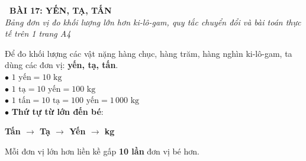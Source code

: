 \documentclass[14pt,a4paper,oneside]{extbook}
\begin{document}
\noindent
\begin{tcolorbox}[
  enhanced,
  colback=teal!8!white,
  colframe=teal!80!black,
  arc=3mm, boxrule=1pt,
  left=3mm, right=3mm, top=2mm, bottom=2mm,
  halign=center
]
  {\Large\bfseries\color{teal!90!black}\faBookmark\ BÀI 17: YẾN, TẠ, TẤN}\\[1.5pt]
  {\footnotesize\itshape\color{black!75} Bảng đơn vị đo khối lượng lớn hơn ki-lô-gam, quy tắc chuyển đổi và bài toán thực tế trên 1 trang A4}
\end{tcolorbox}

\vspace{2mm}

\noindent
\begin{minipage}[t]{0.49\textwidth}
  \begin{tcolorbox}[
    enhanced,
    title={\footnotesize\bfseries\color{white}\faBalanceScale\ 1. Các đơn vị đo khối lượng},
    colback=blue!2!white,
    colframe=blue!75!black,
    arc=2.5mm, boxrule=0.8pt, top=1.8mm, bottom=1.8mm, left=2mm, right=2mm
  ]
    \footnotesize
    Để đo khối lượng các vật nặng hàng chục, hàng trăm, hàng nghìn ki-lô-gam, ta dùng các đơn vị: \textbf{yến, tạ, tấn}.\\
    $\bullet$ $1\text{ yến} = 10\text{ kg}$\\
    $\bullet$ $1\text{ tạ} = 10\text{ yến} = 100\text{ kg}$\\
    $\bullet$ $1\text{ tấn} = 10\text{ tạ} = 100\text{ yến} = 1\,000\text{ kg}$\\
    $\bullet$ \textbf{Thứ tự từ lớn đến bé}:\\
    \begin{center}
      \textbf{Tấn $\rightarrow$ Tạ $\rightarrow$ Yến $\rightarrow$ kg}
    \end{center}
    Mỗi đơn vị lớn hơn liền kề gấp \textbf{10 lần} đơn vị bé hơn.
  \end{tcolorbox}
\end{minipage}%
\hfill
\end{document}
